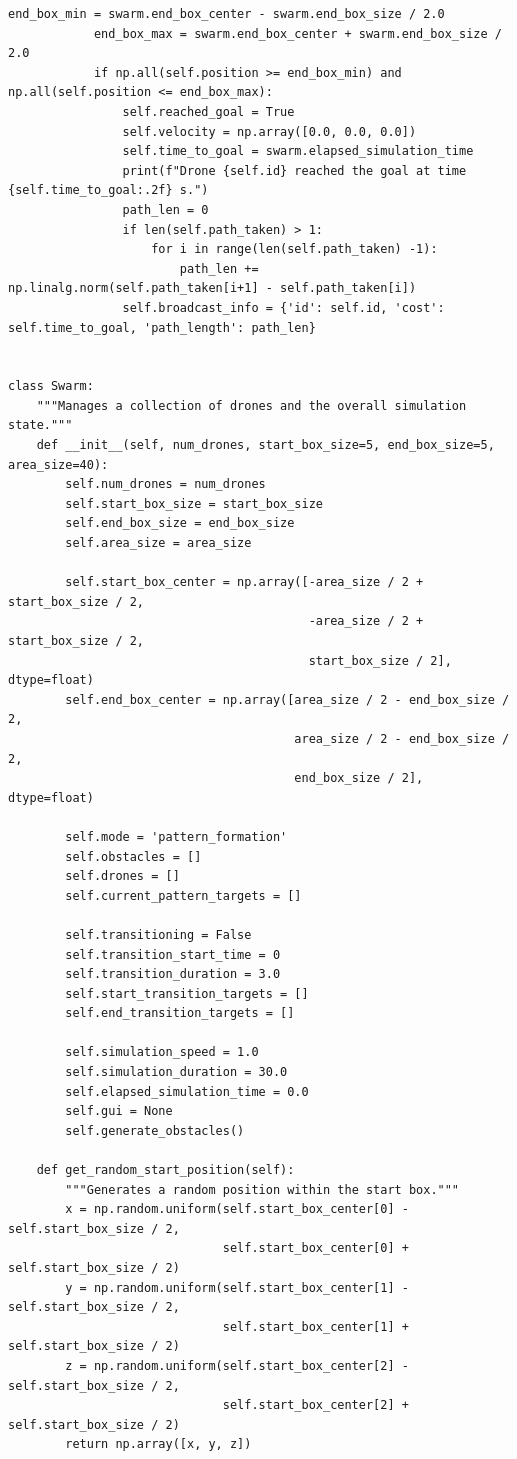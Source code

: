 \documentclass[11pt]{article}
\begin{document}
\begin{lstlisting}[style=pythonstyle]
            end_box_min = swarm.end_box_center - swarm.end_box_size / 2.0
            end_box_max = swarm.end_box_center + swarm.end_box_size / 2.0
            if np.all(self.position >= end_box_min) and np.all(self.position <= end_box_max):
                self.reached_goal = True
                self.velocity = np.array([0.0, 0.0, 0.0])
                self.time_to_goal = swarm.elapsed_simulation_time
                print(f"Drone {self.id} reached the goal at time {self.time_to_goal:.2f} s.")
                path_len = 0
                if len(self.path_taken) > 1:
                    for i in range(len(self.path_taken) -1):
                        path_len += np.linalg.norm(self.path_taken[i+1] - self.path_taken[i])
                self.broadcast_info = {'id': self.id, 'cost': self.time_to_goal, 'path_length': path_len}


class Swarm:
    """Manages a collection of drones and the overall simulation state."""
    def __init__(self, num_drones, start_box_size=5, end_box_size=5, area_size=40):
        self.num_drones = num_drones
        self.start_box_size = start_box_size
        self.end_box_size = end_box_size
        self.area_size = area_size

        self.start_box_center = np.array([-area_size / 2 + start_box_size / 2,
                                          -area_size / 2 + start_box_size / 2,
                                          start_box_size / 2], dtype=float)
        self.end_box_center = np.array([area_size / 2 - end_box_size / 2,
                                        area_size / 2 - end_box_size / 2,
                                        end_box_size / 2], dtype=float)

        self.mode = 'pattern_formation'
        self.obstacles = []
        self.drones = []
        self.current_pattern_targets = []

        self.transitioning = False
        self.transition_start_time = 0
        self.transition_duration = 3.0
        self.start_transition_targets = []
        self.end_transition_targets = []

        self.simulation_speed = 1.0
        self.simulation_duration = 30.0
        self.elapsed_simulation_time = 0.0
        self.gui = None
        self.generate_obstacles()

    def get_random_start_position(self):
        """Generates a random position within the start box."""
        x = np.random.uniform(self.start_box_center[0] - self.start_box_size / 2,
                              self.start_box_center[0] + self.start_box_size / 2)
        y = np.random.uniform(self.start_box_center[1] - self.start_box_size / 2,
                              self.start_box_center[1] + self.start_box_size / 2)
        z = np.random.uniform(self.start_box_center[2] - self.start_box_size / 2,
                              self.start_box_center[2] + self.start_box_size / 2)
        return np.array([x, y, z])


\end{lstlisting}
\end{document}
